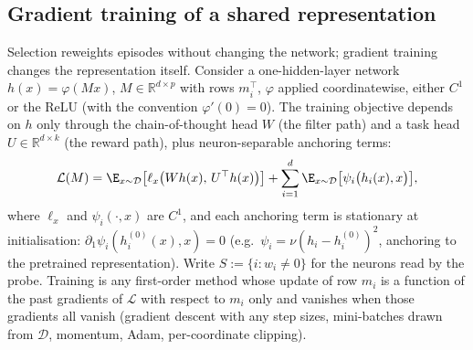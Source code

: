 \subsection{Gradient training of a shared representation}

Selection reweights episodes without changing the network; gradient training changes the representation itself. Consider a one-hidden-layer network $h(x) = \varphi(Mx)$, $M \in \mathbb{R}^{d \times p}$ with rows $m_i^\top$, $\varphi$ applied coordinatewise, either $C^1$ or the ReLU (with the convention $\varphi'(0) = 0$). The training objective depends on $h$ only through the chain-of-thought head $W$ (the filter path) and a task head $U \in \mathbb{R}^{d \times k}$ (the reward path), plus neuron-separable anchoring terms:
\begin{equation}\label{eq:train-objective}
  \mathcal{L}(M) = \E_{x \sim \mathcal{D}}\big[\ell_x\big(W h(x),\, U^\top h(x)\big)\big] + \sum_{i=1}^d \E_{x \sim \mathcal{D}}\big[\psi_i\big(h_i(x), x\big)\big],
\end{equation}
where $\ell_x$ and $\psi_i(\cdot, x)$ are $C^1$, and each anchoring term is stationary at initialisation: $\partial_1 \psi_i(h_i^{(0)}(x), x) = 0$ (e.g.\ $\psi_i = \nu (h_i - h_i^{(0)})^2$, anchoring to the pretrained representation). Write $S := \{i : w_i \neq 0\}$ for the neurons read by the probe. Training is any first-order method whose update of row $m_i$ is a function of the past gradients of $\mathcal{L}$ with respect to $m_i$ only and vanishes when those gradients all vanish (gradient descent with any step sizes, mini-batches drawn from $\mathcal{D}$, momentum, Adam, per-coordinate clipping).

